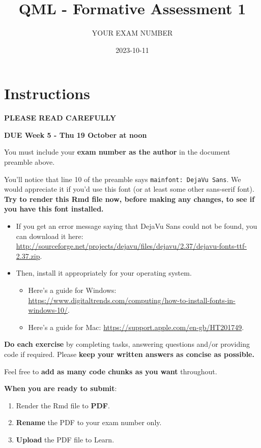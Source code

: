 \documentclass[
]{article}
\title{QML - Formative Assessment 1}
\author{YOUR EXAM NUMBER}
\date{2023-10-11}
\providecommand{\tightlist}{%
  \setlength{\itemsep}{0pt}\setlength{\parskip}{0pt}}
\begin{document}
\maketitle

\section{Instructions}\label{instructions}

\textbf{PLEASE READ CAREFULLY}

\textbf{DUE Week 5 - Thu 19 October at noon}

You must include your \textbf{exam number as the author} in the document
preamble above.

You'll notice that line 10 of the preamble says
\texttt{mainfont:\ DejaVu\ Sans}. We would appreciate it if you'd use
this font (or at least some other sans-serif font). \textbf{Try to
render this Rmd file now, before making any changes, to see if you have
this font installed.}

\begin{itemize}
\tightlist
\item
  If you get an error message saying that DejaVu Sans could not be
  found, you can download it here:
  \url{http://sourceforge.net/projects/dejavu/files/dejavu/2.37/dejavu-fonts-ttf-2.37.zip}.
\item
  Then, install it appropriately for your operating system.

  \begin{itemize}
  \tightlist
  \item
    Here's a guide for Windows:
    \url{https://www.digitaltrends.com/computing/how-to-install-fonts-in-windows-10/}.
  \item
    Here's a guide for Mac:
    \url{https://support.apple.com/en-gb/HT201749}.
  \end{itemize}
\end{itemize}

\textbf{Do each exercise} by completing tasks, answering questions
and/or providing code if required. Please \textbf{keep your written
answers as concise as possible.}

Feel free to \textbf{add as many code chunks as you want} throughout.

\textbf{When you are ready to submit}:

\begin{enumerate}
\def\labelenumi{\arabic{enumi}.}
\tightlist
\item
  Render the Rmd file to \textbf{PDF}.
\item
  \textbf{Rename} the PDF to your exam number only.
\item
  \textbf{Upload} the PDF file to Learn.
\end{enumerate}
\end{document}
